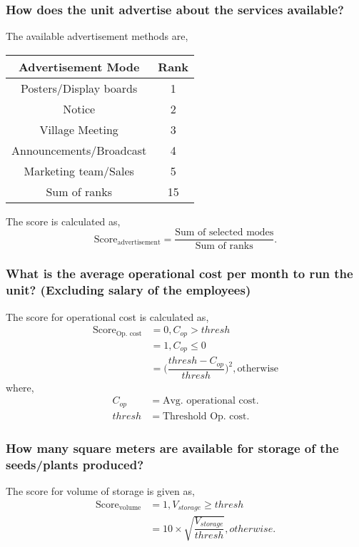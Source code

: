 \documentclass[oneside,twocolumn]{article}
\newcommand{\tsub}[2]{\text{#1}_{\text{#2}}}
\newenvironment{ttable}
               {
                 \begin{center}
                   \begin{tabular}{c|c}
                     \hline
               }
               {
                 \\ \hline
                   \end{tabular}
                 \end{center}
               }
\begin{document}
               \subsubsection{How does the unit advertise about the services available?}
               The available advertisement methods are,
               \begin{ttable}
                 Advertisement Mode & Rank \\ \hline
                 Posters/Display boards & 1 \\
                 Notice & 2 \\
                 Village Meeting & 3 \\
                 Announcements/Broadcast & 4 \\
                 Marketing team/Sales & 5 \\ \hline
                 Sum of ranks & 15
               \end{ttable}

               The score is calculated as,
               \[
               \tsub{Score}{advertisement} = \dfrac{\text{Sum of selected modes}}{\text{Sum of ranks}}.
               \]

               \subsubsection{What is the average operational cost per month to run the unit? (Excluding salary of the employees)}
               The score for operational cost is calculated as,
               \begin{align*}
                 \tsub{Score}{Op. cost} &= 0, C_{op} > thresh \\
                 &= 1, C_{op} \le 0 \\
                 &= \Big(\dfrac{thresh - C_{op}}{thresh}\Big)^2, \text{otherwise}
               \end{align*}
               where,
               \begin{align*}
                 C_{op} &= \text{Avg. operational cost}. \\
                 thresh &= \text{Threshold Op. cost}.
               \end{align*}

               \subsubsection{How many square meters are available for storage of the seeds/plants produced?}
               The score for volume of storage is given as,
               \begin{align*}
                 \tsub{Score}{volume} &= 1, V_{storage} \ge thresh \\
                 &= 10 \times \sqrt{\dfrac{V_{storage}}{thresh}}, otherwise.
               \end{align*}
\end{document}
